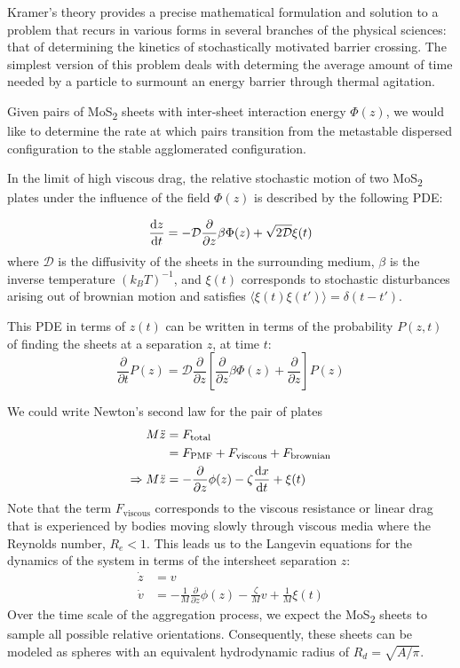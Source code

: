 \documentclass[conference]{IEEETrans/IEEEtran}
\newcommand{\mos} {\texorpdfstring{MoS\textsubscript{2} }{MoS2 }}
\begin{document}
Kramer's theory provides a precise mathematical formulation and solution to a
problem that recurs in various forms in several branches of the physical
sciences: that of determining the kinetics of stochastically motivated barrier
crossing. The simplest version of this problem deals with determing the average
amount of time needed by a particle to surmount an energy barrier through
thermal agitation.

Given pairs of \mos sheets with inter-sheet interaction energy
$\Phi\left(z\right)$, we would like to determine the rate at which pairs
transition from the metastable dispersed configuration to the stable
agglomerated configuration.  

In the limit of high viscous drag, the relative stochastic motion of two \mos
plates under the influence of the field $\Phi(z)$ is described by the following
PDE:

\begin{equation}
    \frac{\dif z}{\dif t} = -\mathcal{D} \frac{\partial }{\partial z}\beta \Phi(z) + \sqrt{2\mathcal{D}}\xi(t)
\end{equation}
where $\mathcal{D}$ is the diffusivity of the sheets in the surrounding medium,
$\beta$ is the inverse temperature $(k_BT)^{-1}$, and $\xi(t)$ corresponds to stochastic disturbances arising out
of brownian motion and satisfies $\langle \xi(t) \xi(t') \rangle = \delta(t -
t')$. 

This PDE in terms of $z(t)$ can be written in terms of the probability $P(z,t)$ of finding the sheets at a separation $z$, at time $t$: 
\begin{equation}
    \frac{\partial}{\partial t} P(z) = \mathcal{D} \frac{\partial}{\partial z} \left[ \frac{\partial}{\partial z}\beta \Phi(z) + \frac{\partial}{\partial z}\right] P(z)
\end{equation}

We could write Newton's second law for the pair of plates
\begin{align}
    M\ddot{z}             &= F_{\text{total}} \nonumber \\
                          &= F_{\text{PMF}} + F_{\text{viscous}} + F_{\text{brownian}} \nonumber \\
    \Rightarrow M\ddot{z} &= -\frac{\partial}{\partial z} \phi(z) - \zeta \frac{\dif x}{\dif t} + \xi(t)
\end{align}
Note that the term $ F_{\text{viscous}}$ corresponds to the viscous resistance or linear drag that is experienced by bodies moving slowly through viscous media where the Reynolds number, $R_e < 1$.
This leads us to the Langevin equations for the dynamics of the system in terms of the intersheet separation $z$:
\begin{align}
    \dot{z} &= v \nonumber \\
    \dot{v} &= - \frac{1}{M} \frac{\partial}{\partial z} \phi(z) - \frac{\zeta}{M} v + \frac{1}{M} \xi(t)
\end{align}
Over the time scale of the aggregation process, we expect the \mos sheets to sample all possible relative orientations. Consequently, these sheets can be modeled as spheres with an equivalent hydrodynamic radius of $R_d = \sqrt{A/\pi}$.
\end{document}
